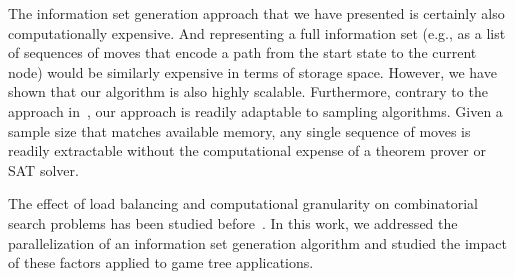 \documentclass[10pt, conference, compsocconf]{IEEEtran}
\begin{document}

The information set generation approach that we have presented is certainly
also computationally expensive.  And representing a full information set (e.g.,
as a list of sequences of moves that encode a path from the start state to the
current node) would be similarly expensive in terms of storage space.  However,
we have shown that our algorithm is also highly scalable.  Furthermore,
contrary to the approach in~\cite{nance06reasoning}, our approach is readily
adaptable to sampling algorithms.  Given a sample size that matches available
memory, any single sequence of moves is readily extractable without the
computational expense of a theorem prover or SAT solver.

The effect of load balancing and computational granularity on combinatorial search problems has been studied before~\cite{sun11adaptive,WeatherAmpiSBAC10}. In this work, we addressed the parallelization of an information set generation algorithm and studied the impact of these factors applied to game tree applications. %


\end{document}
